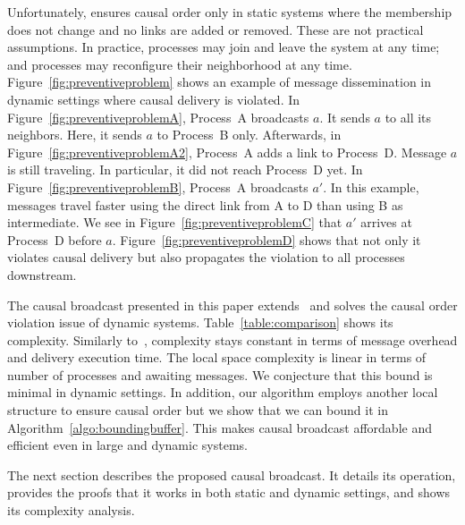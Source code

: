 \begin{figure*}
  \begin{center}
    \hspace{20pt}
    \hspace{20pt}
    \hspace{20pt}
    \hspace{20pt}
    \caption{\label{fig:preventiveproblem}Causal
      broadcast~\cite{friedman2004causal} may violate causal order in dynamic
      settings.}
  \end{center}
\end{figure*}


Unfortunately, \cite{friedman2004causal} ensures causal order only in static
systems where the membership does not change and no links are added or
removed. These are not practical assumptions.  In practice, processes may join
and leave the system at any time; and processes may reconfigure their
neighborhood at any time.  Figure~\ref{fig:preventiveproblem} shows an example
of message dissemination in dynamic settings where causal delivery is
violated. In Figure~\ref{fig:preventiveproblemA}, Process~A broadcasts $a$. It
sends $a$ to all its neighbors. Here, it sends $a$ to Process~B only.
Afterwards, in Figure~\ref{fig:preventiveproblemA2}, Process~A adds a link to
Process~D. Message $a$ is still traveling. In particular, it did not reach
Process~D yet. In Figure~\ref{fig:preventiveproblemB}, Process~A broadcasts
$a'$. In this example, messages travel faster using the direct link from A to D
than using B as intermediate.  We see in Figure~\ref{fig:preventiveproblemC}
that $a'$ arrives at Process~D before $a$. Figure~\ref{fig:preventiveproblemD}
shows that not only it violates causal delivery but also propagates the
violation to all processes downstream.

The causal broadcast presented in this paper extends~\cite{friedman2004causal}
and solves the causal order violation issue of dynamic systems.
Table~\ref{table:comparison} shows its complexity. Similarly
to~\cite{friedman2004causal}, complexity stays constant in terms of message
overhead and delivery execution time. The local space complexity is linear in
terms of number of processes and awaiting messages. We conjecture that this
bound is minimal in dynamic settings. In addition, our algorithm employs another
local structure to ensure causal order but we show that we can bound it in
Algorithm~\ref{algo:boundingbuffer}. This makes causal broadcast affordable and
efficient even in large and dynamic systems.

The next section describes the proposed causal broadcast. It details its
operation, provides the proofs that it works in both static and dynamic
settings, and shows its complexity analysis.


